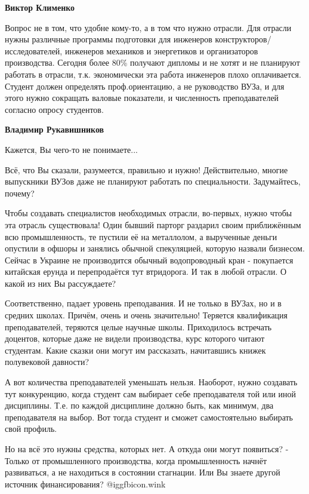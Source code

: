 \begin{itemize}
\begin{itemize}
\begin{itemize}
\textbf{Виктор Клименко} 

Вопрос не в том, что удобне кому-то, а в том что нужно отрасли. Для отрасли
нужны различные программы подготовки для инженеров
конструкторов/исследователей, инженеров механиков и энергетиков и организаторов
производства. Сегодня более 80\% получают дипломы и не хотят и не планируют
работать в отрасли, т.к. экономически эта работа инженеров плохо оплачивается.
Студент должен определять проф.ориентацию, а не руководство ВУЗа, и для этого
нужно сокращать валовые показатели, и численность преподавателей согласно
опросу студентов.


\textbf{Владимир Рукавишников}

Кажется, Вы чего-то не понимаете...

Всё, что Вы сказали, разумеется, правильно и нужно! Действительно, многие
выпускники ВУЗов даже не планируют работать по специальности. Задумайтесь,
почему?

Чтобы создавать специалистов необходимых отрасли, во-первых, нужно чтобы эта
отрасль существовала! Один бывший парторг раздарил своим приближённым всю
промышленность, те пустили её на металлолом, а вырученные деньги опустили в
офшоры и занялись обычной спекуляцией, которую назвали бизнесом. Сейчас в
Украине не производится обычный водопроводный кран - покупается китайская
ерунда и перепродаётся тут втридорога. И так в любой отрасли. О какой из них Вы
рассуждаете?

Соответственно, падает уровень преподавания. И не только в ВУЗах, но и в
средних школах. Причём, очень и очень значительно! Теряется квалификация
преподавателей, теряются целые научные школы. Приходилось встречать доцентов,
которые даже не видели производства, курс которого читают студентам. Какие
сказки они могут им рассказать, начитавшись книжек полувековой давности?

А вот количества преподавателей уменьшать нельзя. Наоборот, нужно создавать тут
конкуренцию, когда студент сам выбирает себе преподавателя той или иной
дисциплины. Т.е. по каждой дисциплине должно быть, как минимум, два
преподавателя на выбор. Вот тогда студент и сможет самостоятельно выбирать свой
профиль.

Но на всё это нужны средства, которых нет. А откуда они могут появиться? -
Только от промышленного производства, когда промышленность начнёт развиваться,
а не находиться в состоянии стагнации. Или Вы знаете другой источник
финансирования?  @igg{fbicon.wink} 


\end{itemize}
\end{itemize}
\end{itemize}

